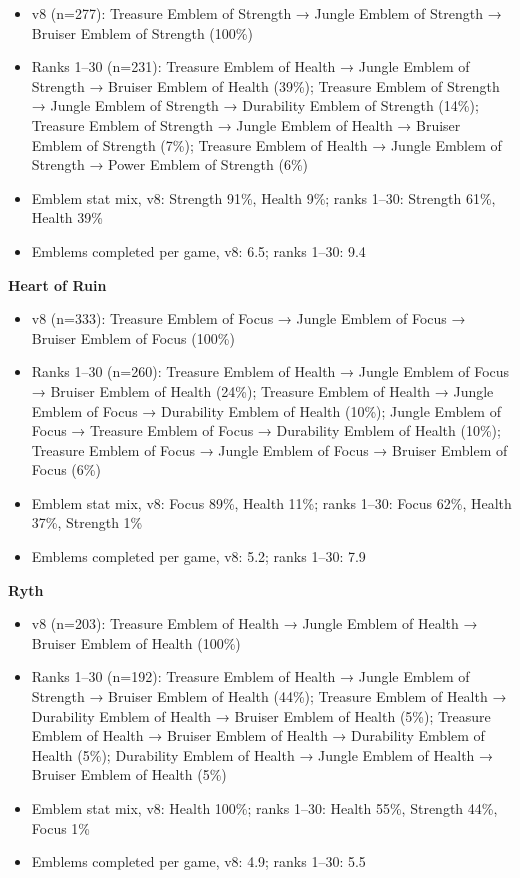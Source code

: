 \documentclass[
  10pt,
]{article}
\providecommand{\tightlist}{%
  \setlength{\itemsep}{0pt}\setlength{\parskip}{0pt}}
\begin{document}
\begin{itemize}
\tightlist
\item
  v8 (n=277): Treasure Emblem of Strength → Jungle Emblem of Strength →
  Bruiser Emblem of Strength (100\%)
\item
  Ranks 1--30 (n=231): Treasure Emblem of Health → Jungle Emblem of
  Strength → Bruiser Emblem of Health (39\%); Treasure Emblem of
  Strength → Jungle Emblem of Strength → Durability Emblem of Strength
  (14\%); Treasure Emblem of Strength → Jungle Emblem of Health →
  Bruiser Emblem of Strength (7\%); Treasure Emblem of Health → Jungle
  Emblem of Strength → Power Emblem of Strength (6\%)
\item
  Emblem stat mix, v8: Strength 91\%, Health 9\%; ranks 1--30: Strength
  61\%, Health 39\%
\item
  Emblems completed per game, v8: 6.5; ranks 1--30: 9.4
\end{itemize}

\textbf{Heart of Ruin}

\begin{itemize}
\tightlist
\item
  v8 (n=333): Treasure Emblem of Focus → Jungle Emblem of Focus →
  Bruiser Emblem of Focus (100\%)
\item
  Ranks 1--30 (n=260): Treasure Emblem of Health → Jungle Emblem of
  Focus → Bruiser Emblem of Health (24\%); Treasure Emblem of Health →
  Jungle Emblem of Focus → Durability Emblem of Health (10\%); Jungle
  Emblem of Focus → Treasure Emblem of Focus → Durability Emblem of
  Health (10\%); Treasure Emblem of Focus → Jungle Emblem of Focus →
  Bruiser Emblem of Focus (6\%)
\item
  Emblem stat mix, v8: Focus 89\%, Health 11\%; ranks 1--30: Focus 62\%,
  Health 37\%, Strength 1\%
\item
  Emblems completed per game, v8: 5.2; ranks 1--30: 7.9
\end{itemize}

\textbf{Ryth}

\begin{itemize}
\tightlist
\item
  v8 (n=203): Treasure Emblem of Health → Jungle Emblem of Health →
  Bruiser Emblem of Health (100\%)
\item
  Ranks 1--30 (n=192): Treasure Emblem of Health → Jungle Emblem of
  Strength → Bruiser Emblem of Health (44\%); Treasure Emblem of Health
  → Durability Emblem of Health → Bruiser Emblem of Health (5\%);
  Treasure Emblem of Health → Bruiser Emblem of Health → Durability
  Emblem of Health (5\%); Durability Emblem of Health → Jungle Emblem of
  Health → Bruiser Emblem of Health (5\%)
\item
  Emblem stat mix, v8: Health 100\%; ranks 1--30: Health 55\%, Strength
  44\%, Focus 1\%
\item
  Emblems completed per game, v8: 4.9; ranks 1--30: 5.5
\end{itemize}
\end{document}
